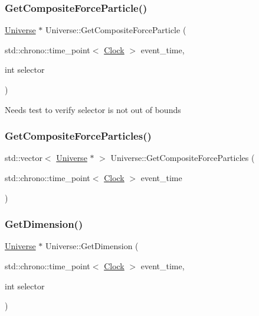 \mbox{\label{classUniverse_a3e2acc1d75765a6e8e852fca919c5b96}} 
\subsubsection{\texorpdfstring{Get\+Composite\+Force\+Particle()}{GetCompositeForceParticle()}}
{\footnotesize\ttfamily \mbox{\hyperlink{classUniverse}{Universe}} $\ast$ Universe\+::\+Get\+Composite\+Force\+Particle (\begin{DoxyParamCaption}\item[{std\+::chrono\+::time\+\_\+point$<$ \mbox{\hyperlink{universe_8h_a0ef8d951d1ca5ab3cfaf7ab4c7a6fd80}{Clock}} $>$}]{event\+\_\+time,  }\item[{int}]{selector }\end{DoxyParamCaption})}

Needs test to verify selector is not out of bounds\mbox{\label{classUniverse_aed37d7224b4e31bdfb0632e39bf19694}} 
\subsubsection{\texorpdfstring{Get\+Composite\+Force\+Particles()}{GetCompositeForceParticles()}}
{\footnotesize\ttfamily std\+::vector$<$ \mbox{\hyperlink{classUniverse}{Universe}} $\ast$ $>$ Universe\+::\+Get\+Composite\+Force\+Particles (\begin{DoxyParamCaption}\item[{std\+::chrono\+::time\+\_\+point$<$ \mbox{\hyperlink{universe_8h_a0ef8d951d1ca5ab3cfaf7ab4c7a6fd80}{Clock}} $>$}]{event\+\_\+time }\end{DoxyParamCaption})}

\mbox{\label{classUniverse_ab79a380dee684c6dc304b571f4d28645}} 
\subsubsection{\texorpdfstring{Get\+Dimension()}{GetDimension()}}
{\footnotesize\ttfamily \mbox{\hyperlink{classUniverse}{Universe}} $\ast$ Universe\+::\+Get\+Dimension (\begin{DoxyParamCaption}\item[{std\+::chrono\+::time\+\_\+point$<$ \mbox{\hyperlink{universe_8h_a0ef8d951d1ca5ab3cfaf7ab4c7a6fd80}{Clock}} $>$}]{event\+\_\+time,  }\item[{int}]{selector }\end{DoxyParamCaption})}

